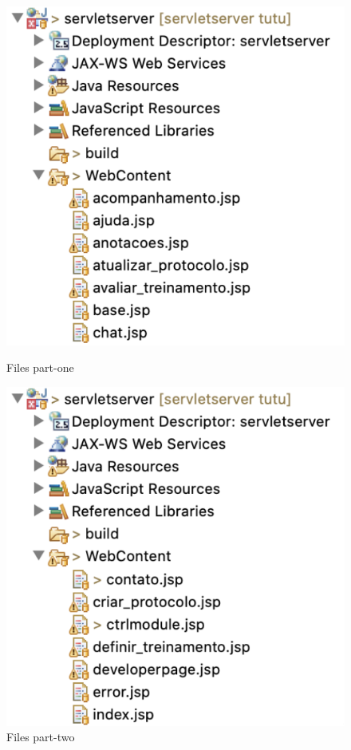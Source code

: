 \begin{figure}[!htbp]
\center
\begin{minipage}{0.495\linewidth}
\center
\captionsetup{justification=centering,margin=0cm,font=small}
\includegraphics[width=0.8\linewidth]{img/cap5/files01}
\caption{Files part-one} \label{fig:files01}
\end{minipage}
\begin{minipage}{0.495\linewidth}
\center
\captionsetup{justification=centering,margin=0cm,font=small}
\includegraphics[width=0.8\linewidth]{img/cap5/files02}
\caption{Files part-two} \label{fig:files02}
\end{minipage}

\end{figure}
